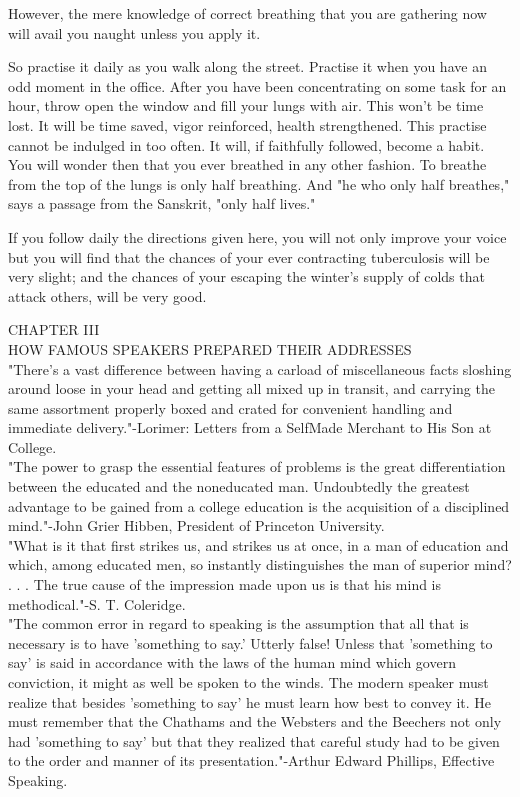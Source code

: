 \documentclass[10pt]{article}
\begin{document}
However, the mere knowledge of correct breathing that you are gathering now will avail you naught unless you apply it.

So practise it daily as you walk along the street. Practise it when you have an odd moment in the office. After you have been concentrating on some task for an hour, throw open the window and fill your lungs with air. This won't be time lost. It will be time saved, vigor reinforced, health strengthened. This practise cannot be indulged in too often. It will, if faithfully followed, become a habit. You will wonder then that you ever breathed in any other fashion. To breathe from the top of the lungs is only half breathing. And "he who only half breathes," says a passage from the Sanskrit, "only half lives."

If you follow daily the directions given here, you will not only improve your voice but you will find that the chances of your ever contracting tuberculosis will be very slight; and the chances of your escaping the winter's supply of colds that attack others, will be very good.

CHAPTER III\\
HOW FAMOUS SPEAKERS PREPARED THEIR ADDRESSES\\
"There's a vast difference between having a carload of miscellaneous facts sloshing around loose in your head and getting all mixed up in transit, and carrying the same assortment properly boxed and crated for convenient handling and immediate delivery."-Lorimer: Letters from a SelfMade Merchant to His Son at College.\\
"The power to grasp the essential features of problems is the great differentiation between the educated and the noneducated man. Undoubtedly the greatest advantage to be gained from a college education is the acquisition of a disciplined mind."-John Grier Hibben, President of Princeton University.\\
"What is it that first strikes us, and strikes us at once, in a man of education and which, among educated men, so instantly distinguishes the man of superior mind? . . . The true cause of the impression made upon us is that his mind is methodical."-S. T. Coleridge.\\
"The common error in regard to speaking is the assumption that all that is necessary is to have 'something to say.' Utterly false! Unless that 'something to say' is said in accordance with the laws of the human mind which govern conviction, it might as well be spoken to the winds. The modern speaker must realize that besides 'something to say' he must learn how best to convey it. He must remember that the Chathams and the Websters and the Beechers not only had 'something to say' but that they realized that careful study had to be given to the order and manner of its presentation."-Arthur Edward Phillips, Effective Speaking.
\end{document}
